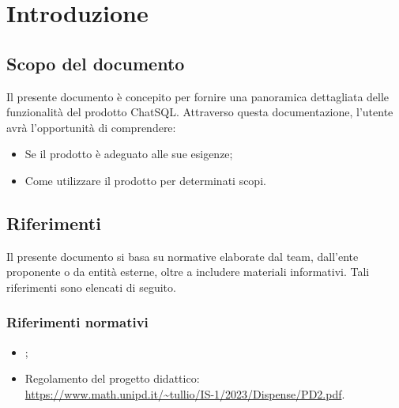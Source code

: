 \section{Introduzione}
\label{sec:introduzione}

\subsection{Scopo del documento}
\par Il presente documento è concepito per fornire una panoramica dettagliata delle funzionalità del prodotto ChatSQL. Attraverso questa documentazione, l'utente avrà l'opportunità di comprendere:
\begin{itemize}
  \item Se il prodotto è adeguato alle sue esigenze;
  \item Come utilizzare il prodotto per determinati scopi.
\end{itemize}

\subsection{Riferimenti}
\par Il presente documento si basa su normative elaborate dal team, dall'ente proponente o da entità esterne, oltre a includere materiali informativi. Tali riferimenti sono elencati di seguito.

\subsubsection{Riferimenti normativi}
\begin{itemize}
  \item \NormeDiProgetto;
  \item Regolamento del progetto didattico:\\ \href{https://www.math.unipd.it/~tullio/IS-1/2023/Dispense/PD2.pdf}{https://www.math.unipd.it/\textasciitilde tullio/IS-1/2023/Dispense/PD2.pdf}.
\end{itemize}

